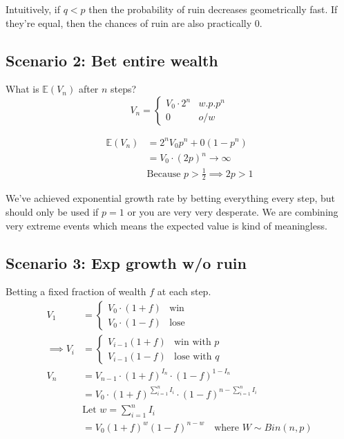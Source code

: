 \documentclass[
  oneside]{book}
\begin{document}
Intuitively, if \(q<p\) then the probability of ruin decreases geometrically fast. If they're equal, then the chances of ruin are also practically 0.

\hypertarget{scenario-2-bet-entire-wealth}{%
\subsection{Scenario 2: Bet entire wealth}\label{scenario-2-bet-entire-wealth}}

What is \(\mathbb{E}(V_{n})\) after \(n\) steps?
\[
V_{n} = \begin{cases}
V_{0}\cdot 2^{n} & w.p. p^{n} \\
0  &  o/w
\end{cases}
\]

\[
\begin{aligned}
\mathbb{E}(V_{n}) &= 2^{n}V_{0}p^{n}+0(1-p^{n})\\
&= V_{0}\cdot (2p)^{n} \to \infty\\
&\text{Because } p > \frac{1}{2}\implies 2p > 1
\end{aligned}
\]

We've achieved exponential growth rate by betting everything every step, but should only be used if \(p=1\) or you are very very desperate. We are combining very extreme events which means the expected value is kind of meaningless.

\hypertarget{scenario-3-exp-growth-wo-ruin}{%
\subsection{Scenario 3: Exp growth w/o ruin}\label{scenario-3-exp-growth-wo-ruin}}

Betting a fixed fraction of wealth \(f\) at each step.
\[
\begin{aligned}
V_{1} &= \begin{cases}
V_{0}\cdot (1+f) & \text{win} \\
V_{0}\cdot (1-f) & \text{lose}
\end{cases}\\
\implies V_{i} &= \begin{cases}
V_{i-1}(1+f) & \text{win with } p\\
V_{i-1}(1-f) & \text{lose with }q
\end{cases}\\
V_{n} &= V_{n-1} \cdot (1+f)^{I_{n}}\cdot(1-f)^{1-I_{n}}\\
&= V_{0}\cdot(1+f)^{\sum^{n}_{i=1} I_{i}}\cdot (1-f)^{n-\sum^{n}_{i=1}I_{i}}\\
&\text{Let }w = \sum^{n}_{i=1}I_{i}\\
&= V_{0}(1+f)^{w}(1-f)^{n-w} \quad \text{where } W\sim Bin(n,p)
\end{aligned}
\]
\end{document}

